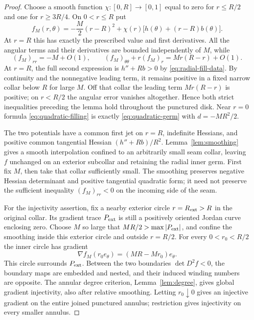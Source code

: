 \documentclass[11pt]{amsart}
\theoremstyle{definition}
\theoremstyle{remark}
\numberwithin{equation}{section}
\begin{document}
\begin{proof}
Choose a smooth function $\chi:[0,R]\to[0,1]$ equal to zero for
$r\le R/2$ and one for $r\ge3R/4$. On $0<r\le R$ put
\begin{equation}\label{eq:quadratic-filling}
 f_M(r,\theta)=-\frac M2(r-R)^2
   +\chi(r)\bigl[h(\theta)+(r-R)b(\theta)\bigr].
\end{equation}
At $r=R$ this has exactly the prescribed value and first derivatives.
All the angular terms and their derivatives are bounded independently
of $M$, while
\begin{equation}\label{eq:quadratic-radial-signs}
 (f_M)_{rr}=-M+O(1),\qquad
 (f_M)_{\theta\theta}+r(f_M)_r
     =Mr(R-r)+O(1).
\end{equation}
At $r=R$, the full second expression is $h''+Rb>0$ by
\eqref{eq:radial-fill-data}. By continuity and the nonnegative
leading term, it remains positive in a fixed narrow collar below
$R$ for large $M$. Off that collar the leading term
$Mr(R-r)$ is positive; on $r<R/2$ the angular error vanishes altogether.
Hence both strict inequalities preceding the lemma hold throughout the
punctured disk. Near $r=0$ formula \eqref{eq:quadratic-filling} is
exactly \eqref{eq:quadratic-germ} with $d=-MR^2/2$.

The two potentials have a common first jet on $r=R$, indefinite
Hessians, and positive common tangential Hessian
$(h''+Rb)/R^2$. Lemma~\ref{lem:smoothing} gives a smooth
interpolation confined to an arbitrarily small seam collar, leaving $f$
unchanged on an exterior subcollar and retaining the radial inner germ. First fix
$M$, then take that collar sufficiently small. The smoothing preserves
negative Hessian determinant and positive tangential quadratic form;
it need not preserve the sufficient inequality $(f_M)_{rr}<0$ on the
incoming side of the seam.

For the injectivity assertion, fix a nearby exterior circle
$r=R_{\rm ext}>R$ in the original collar. Its gradient trace
$P_{\rm ext}$ is still a positively oriented Jordan curve enclosing
zero. Choose $M$ so large that $MR/2>\max|P_{\rm ext}|$, and confine
the smoothing inside this exterior circle and outside $r=R/2$.
For every $0<r_0<R/2$ the inner circle has gradient
\[
 \nabla f_M(r_0e_\theta)=(MR-Mr_0)e_\theta.
\]
This circle surrounds $P_{\rm ext}$. Between the two boundaries
$\det D^2f<0$, the boundary maps are embedded and nested, and their
induced winding numbers are opposite. The annular degree criterion,
Lemma~\ref{lem:degree}, gives global gradient injectivity, also after
relative smoothing. Letting $r_0\downarrow0$ gives an injective gradient
on the entire joined punctured annulus; restriction gives injectivity
on every smaller annulus.
\end{proof}
\end{document}
